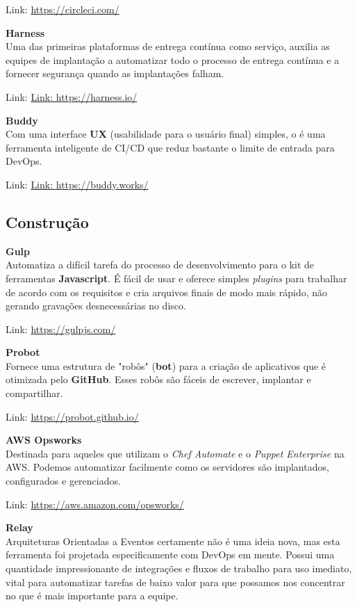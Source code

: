 \documentclass[fleqn,10pt]{SelfArx} %
\begin{document}
Link: \url{https://circleci.com/}

\textbf{Harness} \\
Uma das primeiras plataformas de entrega contínua como serviço, auxilia as equipes de implantação a automatizar todo o processo de entrega contínua e a fornecer segurança quando as implantações falham.

Link: \url{Link: https://harness.io/}

\textbf{Buddy} \\
Com uma interface \textbf{UX} (usabilidade para o usuário final) simples, o é uma ferramenta inteligente de CI/CD que reduz bastante o limite de entrada para DevOps.

Link: \url{Link: https://buddy.works/}

\subsection*{Construção}

\textbf{Gulp} \\
Automatiza a difícil tarefa do processo de desenvolvimento para o kit de ferramentas \textbf{Javascript}. É fácil de usar e oferece simples \textit{plugins} para trabalhar de acordo com os requisitos e cria arquivos finais de modo mais rápido, não gerando gravações desnecessárias no disco.

Link: \url{https://gulpjs.com/}

\textbf{Probot} \\
Fornece uma estrutura de "robôs" (\textbf{bot}) para a criação de aplicativos que é otimizada pelo \textbf{GitHub}. Esses robôs são fáceis de escrever, implantar e compartilhar.

Link: \url{https://probot.github.io/}

\textbf{AWS Opsworks} \\
Destinada para aqueles que utilizam o \textit{Chef Automate} e o \textit{Puppet Enterprise} na AWS. Podemos automatizar facilmente como os servidores são implantados, configurados e gerenciados.

Link: \url{https://aws.amazon.com/opsworks/}

\textbf{Relay} \\
Arquiteturas Orientadas a Eventos certamente não é uma ideia nova, mas esta ferramenta foi projetada especificamente com DevOps em mente. Possui uma quantidade impressionante de integrações e fluxos de trabalho para uso imediato, vital para automatizar tarefas de baixo valor para que possamos nos concentrar no que é mais importante para a equipe.
\end{document}
